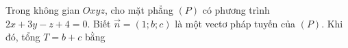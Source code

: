 \begin{ex}
Trong không gian $Oxyz$, cho mặt phẳng $(P)$ có phương trình $2x+3y-z+4=0$. Biết $\vec n=(1;b;c)$ là một vectơ pháp tuyến của $(P)$. Khi đó, tổng $T=b+c$ bằng
\end{ex}
